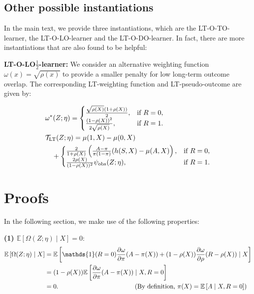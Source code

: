 \documentclass{article}
\theoremstyle{plain}
\theoremstyle{definition}
\theoremstyle{remark}
\newcommand{\E}{\mathbb{E}}                %
\newcommand{\1}{\mathds{1}}                %
\newcommand{\TO}{LT-O-TO-learner\xspace}
\newcommand{\LO}{LT-O-LO-learner\xspace}
\newcommand{\DO}{LT-O-DO-learner\xspace}
\begin{document}
\subsection{Other possible instantiations}
In the main text, we provide three instantiations, which are the \TO, the \LO and the \DO. In fact, there are more instantiations that are also found to be helpful:

\textbf{LT-O-LO$\frac{1}{2}$-learner:} We consider an alternative weighting function $\omega(x)=\sqrt{\rho(x)}$ to provide a smaller penalty for low long-term outcome overlap. The corresponding LT-weighting function and LT-pseudo-outcome are given by:



\begin{align*}
    &\omega^*(Z;\eta) = \begin{cases} 
       \frac{\sqrt{\rho(X)}(1+\rho(X))}{2}, & \text{if } R=0, \\
       \frac{(1-\rho(X))^2}{2\sqrt{\rho(X)}}, & \text{if } R=1.
    \end{cases} \\
    &\mathcal{T}_\mathrm{LT}(Z;\eta) = \mu(1,X)-\mu(0,X) \notag \\
    &\quad + \begin{cases} 
      \frac{2}{1+\rho(X)}\left(\frac{A-\pi}{\pi(1-\pi)}(h(S,X)-\mu(A,X) \right), & \text{if } R=0, \\
      \frac{2\rho(X)}{(1-\rho(X))^2} \psi_\mathrm{obs}(Z;\eta), & \text{if } R=1.
    \end{cases}
\end{align*}




\newpage
\section{Proofs}
\label{app:proofs}
In the following section, we make use of the following properties:

\textbf{(1) $\E\left[\Omega(Z;\eta) \mid X\right]=0$}: 
\begin{align}
\label{eq:Omega-mean-zero-property}
    \E\left[\Omega(Z;\eta) \mid X\right] &= \E\left[\1(R=0) \frac{\partial \omega}{\partial \pi} (A - \pi(X)) + (1-\rho(X)) \frac{\partial \omega}{\partial \rho} (R - \rho(X)) \mid X\right] \notag \\
    &=(1 - \rho(X))\E\left[\frac{\partial \omega}{\partial \pi} (A - \pi(X))\mid X, R = 0\right] \notag \\
    &= 0. \qquad \qquad \qquad \qquad  \qquad \qquad(\text{By definition, } \pi(X)=\E\left[A\mid X,R=0\right])
\end{align}
\end{document}
